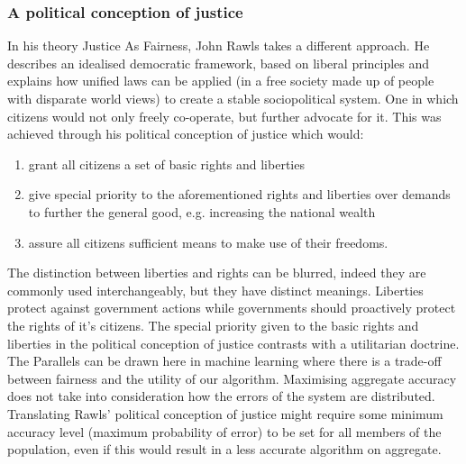 \subsubsection*{A political conception of justice}

In his theory Justice As Fairness\cite{JusticeFairness}, John Rawls takes a different approach. He describes an idealised democratic framework, based on liberal principles and explains how unified laws can be applied (in a free society made up of people with disparate world views) to create a stable sociopolitical system. One in which citizens would not only freely co-operate, but further advocate for it. This was achieved through his political conception of justice which would:
%
\begin{enumerate}
\item grant all citizens a set of basic rights and liberties
\item give special priority to the aforementioned rights and liberties over demands to further the general good, e.g. increasing the national wealth
\item assure all citizens sufficient means to make use of their freedoms.
\end{enumerate}

The distinction between liberties and rights can be blurred, indeed they are commonly used interchangeably, but they have distinct meanings. Liberties protect against government actions while governments should proactively protect the rights of it's citizens. The special priority given to the basic rights and liberties in the political conception of justice contrasts with a utilitarian doctrine. The Parallels can be drawn here in machine learning where there is a trade-off between fairness and the utility of our algorithm. Maximising aggregate accuracy does not take into consideration how the errors of the system are distributed. Translating Rawls' political conception of justice might require some minimum accuracy level (maximum probability of error) to be set for all members of the population, even if this would result in a less accurate algorithm on aggregate.

